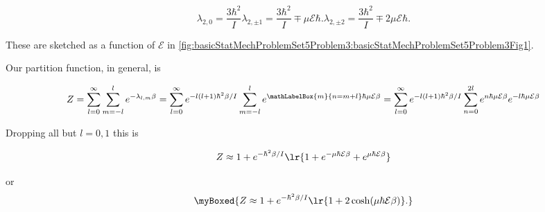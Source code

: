 {\begin{subequations}
\begin{equation}\label{eqn:basicStatMechProblemSet5Problem3:160}
\lambda_{2,0} = \frac{3 \hbar^2}{I} 
\end{equation}
\begin{equation}\label{eqn:basicStatMechProblemSet5Problem3:180}
\lambda_{2,\pm 1} = \frac{3 \hbar^2}{I} \mp \mu \mathcal{E} \hbar.
\end{equation}
\begin{equation}\label{eqn:basicStatMechProblemSet5Problem3:200}
\lambda_{2,\pm 2} = \frac{3 \hbar^2}{I} \mp 2 \mu \mathcal{E} \hbar.
\end{equation}
\end{subequations}

These are sketched as a function of $\mathcal{E}$ in \cref{fig:basicStatMechProblemSet5Problem3:basicStatMechProblemSet5Problem3Fig1}.



Our partition function, in general, is

\begin{dmath}\label{eqn:basicStatMechProblemSet5Problem3:220}
Z 
= \sum_{l = 0}^\infty \sum_{m = -l}^l e^{-\lambda_{l,m} \beta}
= \sum_{l = 0}^\infty e^{-l(l+1) \hbar^2 \beta/I} \sum_{m = -l}^l e^{
\mathLabelBox{
m 
}{n = m + l}
\hbar \mu \mathcal{E} \beta}
= \sum_{l = 0}^\infty e^{-l(l+1) \hbar^2 \beta/I} \sum_{n = 0}^{2l} 
e^{n \hbar \mu \mathcal{E} \beta}
e^{-l \hbar \mu \mathcal{E} \beta}
\end{dmath}

Dropping all but $l = 0, 1$ this is

\begin{equation}\label{eqn:basicStatMechProblemSet5Problem3:320}
Z 
\approx 
1 + e^{-\hbar^2 \beta/I} 
\lr{ 1 + e^{- \mu \hbar \mathcal{E} \beta } + e^{ \mu \hbar \mathcal{E} \beta}}
\end{equation}

or
\begin{equation}\label{eqn:basicStatMechProblemSet5Problem3:340}
\myBoxed{
Z 
\approx 
1 + e^{-\hbar^2 \beta/I} 
\lr{1 + 2 \cosh( \mu \hbar \mathcal{E} \beta)}.
}
\end{equation}

}
